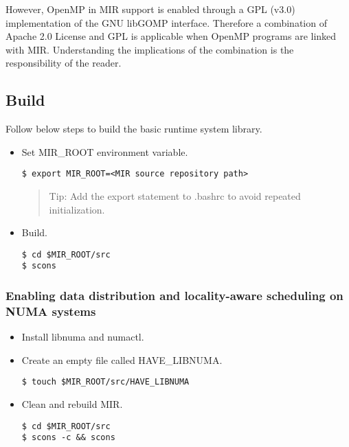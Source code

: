 \documentclass[11pt,a4paper]{article}
\begin{document}
However, OpenMP in MIR support is enabled through a GPL (v3.0) implementation of the GNU libGOMP interface. Therefore a combination of Apache 2.0 License and GPL is applicable when OpenMP programs are linked with MIR. Understanding the implications of the combination is the responsibility of the reader.

\subsection{Build}\label{build}

Follow below steps to build the basic runtime system library.

\begin{itemize}
\item Set MIR\_ROOT environment variable.

\begin{lstlisting}[style=MyInputStyle]
$ export MIR_ROOT=<MIR source repository path>
\end{lstlisting}

\begin{framed}
\begin{quote}
Tip: Add the export statement to .bashrc to avoid repeated initialization.
\end{quote}
\end{framed}

\item Build.

\begin{lstlisting}[style=MyInputStyle]
$ cd $MIR_ROOT/src
$ scons
\end{lstlisting}
\end{itemize}

\subsubsection{Enabling data distribution and locality-aware scheduling on NUMA systems}\label{enabling-data-distribution-and-locality-aware-scheduling-on-numa-systems}

\begin{itemize}
\item Install libnuma and numactl.
\item Create an empty file called HAVE\_LIBNUMA.

\begin{lstlisting}[style=MyInputStyle]
$ touch $MIR_ROOT/src/HAVE_LIBNUMA
\end{lstlisting}

\item Clean and rebuild MIR.

\begin{lstlisting}[style=MyInputStyle]
$ cd $MIR_ROOT/src
$ scons -c && scons
\end{lstlisting}
\end{itemize}
\end{document}
